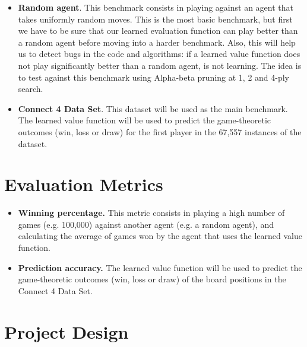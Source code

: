 \documentclass{article}
\begin{document}
\begin{itemize}

    \item \textbf{Random agent}. This benchmark consists in playing against an agent that takes
        uniformly random moves. This is the most basic benchmark, but first we have to be sure that
        our learned evaluation function can play better than a random agent before moving into a
        harder benchmark. Also, this will help us to detect bugs in the code and algorithms: if a
        learned value function does not play significantly better than a random agent, is not
        learning. The idea is to test against this benchmark using Alpha-beta pruning at 1, 2 and
        4-ply search.

    \item \textbf{Connect 4 Data Set}. This dataset will be used as the main benchmark. The learned
        value function will be used to predict the game-theoretic outcomes (win, loss or draw) for
        the first player in the 67,557 instances of the dataset.

\end{itemize}

\section{Evaluation Metrics}

\begin{itemize}

    \item \textbf{Winning percentage.} This metric consists in playing a high number of games (e.g.
        100,000) against another agent (e.g. a random agent), and calculating the average of games
        won by the agent that uses the learned value function.
        
    \item \textbf{Prediction accuracy.} The learned value function will be used to predict the
        game-theoretic outcomes (win, loss or draw) of the board positions in the Connect 4 Data
        Set.

\end{itemize}

\section{Project Design}
\label{sec:project-design}
\end{document}
